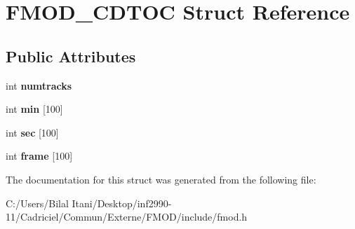 \hypertarget{struct_f_m_o_d___c_d_t_o_c}{}\section{F\+M\+O\+D\+\_\+\+C\+D\+T\+OC Struct Reference}
\label{struct_f_m_o_d___c_d_t_o_c}
\subsection*{Public Attributes}
\begin{DoxyCompactItemize}
\item 
int {\bfseries numtracks}\hypertarget{struct_f_m_o_d___c_d_t_o_c_aad0a3526919d1d67958c47179a73cf7b}{}\label{struct_f_m_o_d___c_d_t_o_c_aad0a3526919d1d67958c47179a73cf7b}

\item 
int {\bfseries min} \mbox{[}100\mbox{]}\hypertarget{struct_f_m_o_d___c_d_t_o_c_ac32672636e86e7d5da6cd02737123f0e}{}\label{struct_f_m_o_d___c_d_t_o_c_ac32672636e86e7d5da6cd02737123f0e}

\item 
int {\bfseries sec} \mbox{[}100\mbox{]}\hypertarget{struct_f_m_o_d___c_d_t_o_c_a20dcf991841f7f4322904f9a1175e7c6}{}\label{struct_f_m_o_d___c_d_t_o_c_a20dcf991841f7f4322904f9a1175e7c6}

\item 
int {\bfseries frame} \mbox{[}100\mbox{]}\hypertarget{struct_f_m_o_d___c_d_t_o_c_a40e8bdc25c765a02c4ca0af13c74dc5f}{}\label{struct_f_m_o_d___c_d_t_o_c_a40e8bdc25c765a02c4ca0af13c74dc5f}

\end{DoxyCompactItemize}


The documentation for this struct was generated from the following file\+:\begin{DoxyCompactItemize}
\item 
C\+:/\+Users/\+Bilal Itani/\+Desktop/inf2990-\/11/\+Cadriciel/\+Commun/\+Externe/\+F\+M\+O\+D/include/fmod.\+h\end{DoxyCompactItemize}
